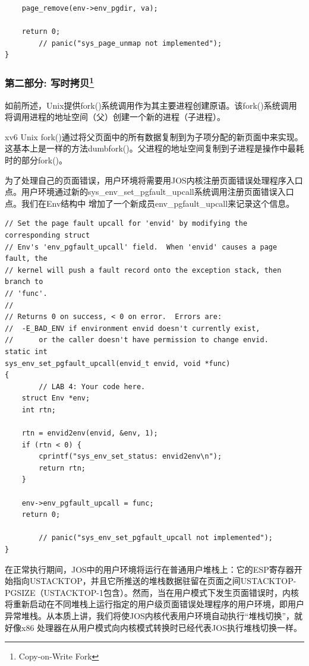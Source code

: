 \begin{ExerciseList}
\begin{verbatim}
    page_remove(env->env_pgdir, va);

    return 0;
        // panic("sys_page_unmap not implemented");
}
\end{verbatim}

\subsubsection[第二部分: 写时拷贝]{第二部分: 写时拷贝\footnote{Copy-on-Write Fork}}

如前所述，Unix提供fork()系统调用作为其主要进程创建原语。该fork()系统调用将调用进程的地址空间（父）创建一个新的进程（子进程）。

xv6 Unix fork()通过将父页面中的所有数据复制到为子项分配的新页面中来实现。这基本上是一样的方法dumbfork()。父进程的地址空间复制到子进程是操作中最耗时的部分fork()。

为了处理自己的页面错误，用户环境将需要用JOS内核注册页面错误处理程序入口点。用户环境通过新的sys\_env\_set\_pgfault\_upcall系统调用注册页面错误入口点。我们在Env结构中 增加了一个新成员env\_pgfault\_upcall来记录这个信息。


\begin{verbatim}
// Set the page fault upcall for 'envid' by modifying the corresponding struct
// Env's 'env_pgfault_upcall' field.  When 'envid' causes a page fault, the
// kernel will push a fault record onto the exception stack, then branch to
// 'func'.
//
// Returns 0 on success, < 0 on error.  Errors are:
//	-E_BAD_ENV if environment envid doesn't currently exist,
//		or the caller doesn't have permission to change envid.
static int
sys_env_set_pgfault_upcall(envid_t envid, void *func)
{
        // LAB 4: Your code here.
    struct Env *env;
    int rtn;

    rtn = envid2env(envid, &env, 1);
    if (rtn < 0) {
        cprintf("sys_env_set_status: envid2env\n");
        return rtn;
    }

    env->env_pgfault_upcall = func;
    return 0;

        // panic("sys_env_set_pgfault_upcall not implemented");
}
\end{verbatim}

在正常执行期间，JOS中的用户环境将运行在普通用户堆栈上：它的ESP寄存器开始指向USTACKTOP，并且它所推送的堆栈数据驻留在页面之间USTACKTOP-PGSIZE（USTACKTOP-1包含）。然而，当在用户模式下发生页面错误时，内核将重新启动在不同堆栈上运行指定的用户级页面错误处理程序的用户环境，即用户异常堆栈。从本质上讲，我们将使JOS内核代表用户环境自动执行“堆栈切换”，就好像x86 处理器在从用户模式向内核模式转换时已经代表JOS执行堆栈切换一样。


\end{ExerciseList}
